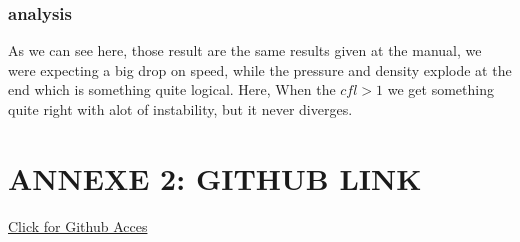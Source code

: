 \documentclass[12pt]{article}
\begin{document}
\subsubsection{analysis}
As we can see here, those result are the same results given at the manual, we were expecting a big drop on speed, while the pressure and density explode at the end
which is something quite logical. Here, When the $cfl>1$ we get something quite right with alot of instability, but it never diverges. 
\section{ANNEXE 2: GITHUB LINK}

\href{https://github.com/Kenesis69/MEC_6602E_HOMEWORK_2}{Click for Github Acces}
\end{document}
